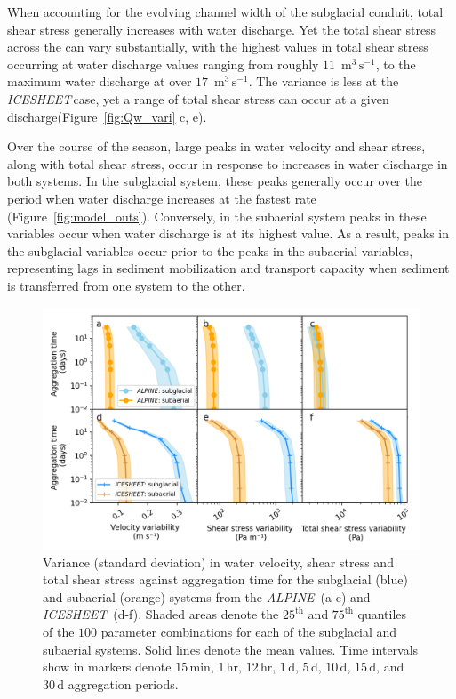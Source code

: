 \documentclass[11pt]{article}
\newcommand{\alpine}{\textit{ALPINE}\,}
\newcommand{\icesheet}{\textit{ICESHEET}\,}
\newcommand{\unit}[1]{$\mathrm{#1}$}
\begin{document}
When accounting for the evolving channel width of the subglacial conduit, total shear stress generally increases with water discharge.
Yet the total shear stress across the can vary substantially, with the highest values in total shear stress occurring at water discharge values ranging from roughly $11$ \,\unit{m}$^3$\,\unit{s}$^{-1}$, to the maximum water discharge at over $17$ \,\unit{m}$^3$\,\unit{s}$^{-1}$.
The variance is less at the \icesheet case, yet a range of total shear stress can occur at a given discharge(Figure~\ref{fig:Qw_vari} c, e).

Over the course of the season, large peaks in water velocity and shear stress, along with total shear stress, occur in response to increases in water discharge in both systems.
In the subglacial system, these peaks generally occur over the period when water discharge increases at the fastest rate (Figure~\ref{fig:model_outs}).
Conversely, in the subaerial system peaks in these variables occur when water discharge is at its highest value.
As a result, peaks in the subglacial variables occur prior to the peaks in the subaerial variables, representing lags in sediment mobilization and  transport capacity when sediment is transferred from one system to the other.

\begin{center}
  \begin{figure}[h]
    \includegraphics[width=0.8\linewidth]{Fig4.png}
    \caption{Variance (standard deviation) in water velocity, shear stress and total shear stress against aggregation time for the subglacial (blue) and subaerial (orange) systems from the \alpine{} (a-c) and \icesheet{} (d-f).
      Shaded areas denote the $25^{\mathrm{th}}$ and $75^{\mathrm{th}}$ quantiles of the $100$ parameter combinations for each of the subglacial and subaerial systems.
      Solid lines denote the mean values.
      Time intervals show in markers denote $15$\,\unit{min}, $1$\,\unit{hr}, $12$\,\unit{hr}, $1$\,\unit{d}, $5$\,\unit{d}, $10$\,\unit{d}, $15$\,\unit{d}, and $30$\,\unit{d} aggregation periods.
    } 
    \label{fig:multi_run}
  \end{figure}
\end{center}
\end{document}

